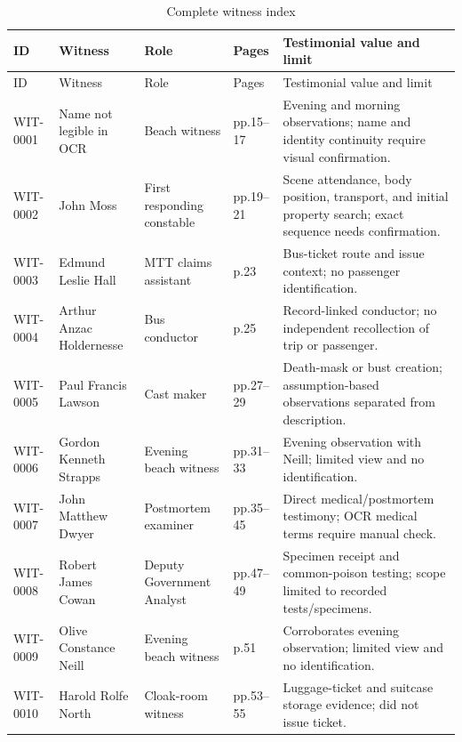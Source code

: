 \begingroup
\scriptsize
\setlength{\tabcolsep}{2pt}
\renewcommand{\arraystretch}{1.12}
\begin{longtable}{>{\raggedright\arraybackslash}p{}>{\raggedright\arraybackslash}p{}>{\raggedright\arraybackslash}p{}>{\raggedright\arraybackslash}p{}>{\raggedright\arraybackslash}p{}}
\caption{Complete witness index}\label{tab:complete-witness-index}\\
\toprule
ID & Witness & Role & Pages & Testimonial value and limit \\
\midrule
\endfirsthead
\toprule
ID & Witness & Role & Pages & Testimonial value and limit \\
\midrule
\endhead
WIT-0001 & Name not legible in OCR & Beach witness & pp.15--17 & Evening and morning observations; name and identity continuity require visual confirmation. \\
WIT-0002 & John Moss & First responding constable & pp.19--21 & Scene attendance, body position, transport, and initial property search; exact sequence needs confirmation. \\
WIT-0003 & Edmund Leslie Hall & MTT claims assistant & p.23 & Bus-ticket route and issue context; no passenger identification. \\
WIT-0004 & Arthur Anzac Holdernesse & Bus conductor & p.25 & Record-linked conductor; no independent recollection of trip or passenger. \\
WIT-0005 & Paul Francis Lawson & Cast maker & pp.27--29 & Death-mask or bust creation; assumption-based observations separated from description. \\
WIT-0006 & Gordon Kenneth Strapps & Evening beach witness & pp.31--33 & Evening observation with Neill; limited view and no identification. \\
WIT-0007 & John Matthew Dwyer & Postmortem examiner & pp.35--45 & Direct medical/postmortem testimony; OCR medical terms require manual check. \\
WIT-0008 & Robert James Cowan & Deputy Government Analyst & pp.47--49 & Specimen receipt and common-poison testing; scope limited to recorded tests/specimens. \\
WIT-0009 & Olive Constance Neill & Evening beach witness & p.51 & Corroborates evening observation; limited view and no identification. \\
WIT-0010 & Harold Rolfe North & Cloak-room witness & pp.53--55 & Luggage-ticket and suitcase storage evidence; did not issue ticket. \\

\end{longtable}
